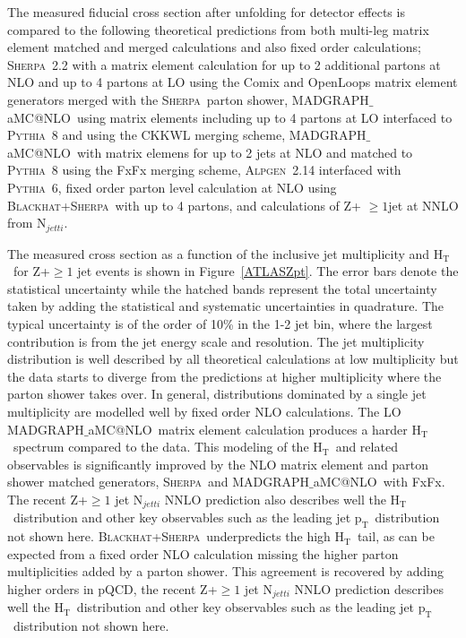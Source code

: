 \documentclass[a4paper,11pt,notoc]{article}
\makeatletter
\newcommand{\pt}{\ensuremath{\mathrm{p_T}}}
\newcommand{\Ht}{\ensuremath{\mathrm{H_T}}}
\newcommand{\PYTHIA}{\textsc{Pythia}}
\newcommand{\SHERPA}{\textsc{Sherpa}}
\newcommand{\BLACKHAT}{\textsc{Blackhat}}
\newcommand{\ALPGEN}{\textsc{Alpgen}}
\newcommand{\MGNLO}{MADGRAPH$\_$aMC@NLO}
\makeatother
\begin{document}
The measured fiducial cross section after unfolding for detector effects is compared to the following theoretical predictions from both multi-leg matrix element matched and merged calculations and also fixed order calculations; \SHERPA\ 2.2 with a matrix element calculation for up to 2 additional partons at NLO and up to 4 partons at LO using the Comix and OpenLoops matrix element generators merged with the \SHERPA\ parton shower, \MGNLO\ using matrix elements including up to 4 partons at LO interfaced to \PYTHIA\ 8 and using the CKKWL merging scheme, \MGNLO\ with matrix elemens for up to 2 jets at NLO and matched to \PYTHIA\ 8 using the FxFx merging scheme, \ALPGEN\ 2.14 interfaced with \PYTHIA\ 6, fixed order parton level calculation at NLO using \BLACKHAT+\SHERPA\ with up to 4 partons, and calculations of Z+ $\ge 1$jet at NNLO from N$_{jetti}$. 

The measured cross section as a function of the inclusive jet multiplicity and \Ht\ for Z+$\ge 1$ jet events is shown in Figure~\ref{ATLASZpt}.
The error bars denote the statistical uncertainty while the hatched bands represent the total uncertainty taken by adding the statistical and systematic uncertainties in quadrature. The typical uncertainty is of the order of 10\% in the 1-2 jet bin, where the largest contribution is from the jet energy scale and resolution. 
The jet multiplicity distribution is well described by all theoretical calculations at low multiplicity but the data starts to diverge from the predictions at higher multiplicity where the parton shower takes over. 
In general, distributions dominated by a single jet multiplicity are modelled well by fixed order NLO calculations. The LO \MGNLO\ matrix element calculation produces a harder \Ht\ spectrum compared to the data. This modeling of the \Ht\ and related observables is significantly improved by the NLO matrix element and parton shower matched generators, \SHERPA\ and \MGNLO\ with FxFx. The recent Z+$\ge 1$ jet N$_{jetti}$ NNLO prediction also describes well the \Ht\ distribution and other key observables such as the leading jet \pt\ distribution not shown here. \BLACKHAT+\SHERPA\ underpredicts the high \Ht\ tail, as can be expected from a fixed order NLO calculation missing the higher parton multiplicities added by a parton shower. This agreement is recovered by adding higher orders in pQCD, the recent Z+$\ge 1$ jet N$_{jetti}$ NNLO prediction describes well the \Ht\ distribution and other key observables such as the leading jet \pt\ distribution not shown here.
\end{document}
